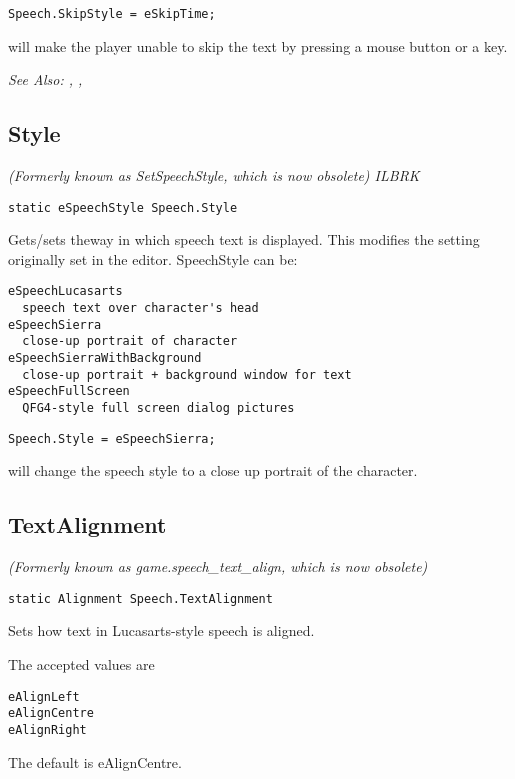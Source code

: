 \begin{verbatim}
Speech.SkipStyle = eSkipTime;
\end{verbatim}
will make the player unable to skip the text by pressing a mouse button or a key.

\it{See Also:} ,
,


\subsection{Style}\label{Speech.Style}%

\it{(Formerly known as SetSpeechStyle, which is now obsolete)} ILBRK

\begin{verbatim}
static eSpeechStyle Speech.Style
\end{verbatim}

Gets/sets theway in which speech text is displayed. This modifies the setting
originally set in the editor. SpeechStyle can be:
\begin{verbatim}
eSpeechLucasarts
  speech text over character's head
eSpeechSierra
  close-up portrait of character
eSpeechSierraWithBackground
  close-up portrait + background window for text
eSpeechFullScreen
  QFG4-style full screen dialog pictures
\end{verbatim}

\begin{verbatim}
Speech.Style = eSpeechSierra;
\end{verbatim}
will change the speech style to a close up portrait of the character.


\subsection{TextAlignment}\label{Speech.TextAlignment}%

\it{(Formerly known as game.speech_text_align, which is now obsolete)}

\begin{verbatim}
static Alignment Speech.TextAlignment
\end{verbatim}

Sets how text in Lucasarts-style speech is aligned.

The accepted values are
\begin{verbatim}
eAlignLeft
eAlignCentre
eAlignRight
\end{verbatim}
The default is eAlignCentre.


